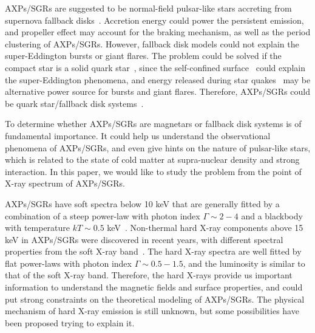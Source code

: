 \documentclass[]{raa}
\begin{document}
AXPs/SGRs are suggested to be normal-field pulsar-like stars accreting from supernova fallback disks~\citep{Chatterjee00, Alpar01}.
%
Accretion energy could power the persistent emission, and propeller effect may account for the braking mechanism, as well as the period clustering of AXPs/SGRs.
%
However, fallback disk models could not explain the super-Eddington bursts or giant flares.
%
The problem could be solved if the compact star is a solid quark star~\citep{Xu03},  since the self-confined surface~\citep{Alock86} could explain the super-Eddington phenomena, and energy released during star quakes~\citep{Xu06} may be alternative power source for bursts and giant flares.
%
Therefore, AXPs/SGRs could be quark star/fallback disk systems~\citep{Xu07, TX11}.

%
%
To determine whether AXPs/SGRs are magnetars or fallback disk systems is of fundamental importance.
%
It could help us understand the observational phenomena of AXPs/SGRs, and even give hints on the nature of pulsar-like stars, which is related to the state of cold matter at supra-nuclear density and strong interaction.
%
In this paper, we would like to study the problem from the point of X-ray spectrum of AXPs/SGRs.
%

AXPs/SGRs have soft spectra below 10 keV that are generally fitted by a combination of a steep power-law with photon index  $\Gamma \sim 2-4$ and a blackbody with temperature $kT \sim 0.5$ keV~\citep{Mereghetti08}.
%
Non-thermal hard X-ray components above 15 keV in AXPs/SGRs were discovered in recent years, with different spectral properties from the soft X-ray band~\citep{Kuiper06}.
%
The hard X-ray spectra are well fitted by flat power-laws with photon index $\Gamma \sim 0.5-1.5$, and the luminosity is similar to that of the soft X-ray band.
%
Therefore, the hard X-rays provide us important information to understand the magnetic fields and surface properties, and could put strong constraints on the theoretical modeling of AXPs/SGRs.
%
The physical mechanism of hard X-ray emission is still unknown, but some possibilities have been proposed trying to explain it.
%
\end{document}
